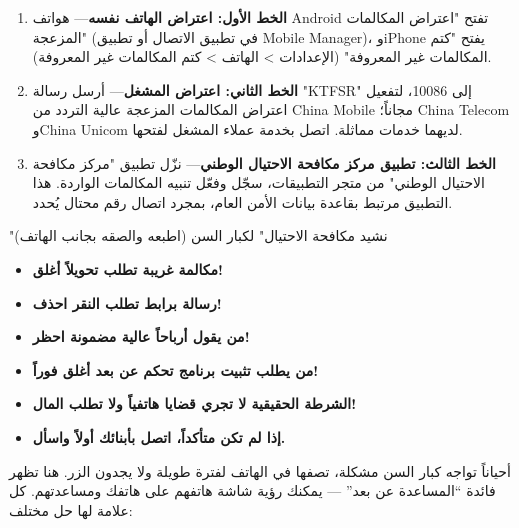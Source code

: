 
\begin{enumerate}
  \item \textbf{الخط الأول: اعتراض الهاتف نفسه}— هواتف Android تفتح "اعتراض المكالمات المزعجة" (في تطبيق الاتصال أو تطبيق Mobile Manager)، وiPhone يفتح "كتم المكالمات غير المعروفة" (الإعدادات > الهاتف > كتم المكالمات غير المعروفة).
  \item \textbf{الخط الثاني: اعتراض المشغل}— أرسل رسالة "KTFSR" إلى 10086، لتفعيل اعتراض المكالمات المزعجة عالية التردد من China Mobile مجاناً؛ China Telecom وChina Unicom لديهما خدمات مماثلة. اتصل بخدمة عملاء المشغل لفتحها.
  \item \textbf{الخط الثالث: تطبيق مركز مكافحة الاحتيال الوطني}— نزّل تطبيق "مركز مكافحة الاحتيال الوطني" من متجر التطبيقات، سجّل وفعّل تنبيه المكالمات الواردة. هذا التطبيق مرتبط بقاعدة بيانات الأمن العام، بمجرد اتصال رقم محتال يُحدد.
\end{enumerate}

\begin{tcbwarn}{"نشيد مكافحة الاحتيال" لكبار السن (اطبعه والصقه بجانب الهاتف)}
\begin{itemize}
  \item \textbf{مكالمة غريبة تطلب تحويلاً أغلق!}
  \item \textbf{رسالة برابط تطلب النقر احذف!}
  \item \textbf{من يقول أرباحاً عالية مضمونة احظر!}
  \item \textbf{من يطلب تثبيت برنامج تحكم عن بعد أغلق فوراً!}
  \item \textbf{الشرطة الحقيقية لا تجري قضايا هاتفياً ولا تطلب المال!}
  \item \textbf{إذا لم تكن متأكداً، اتصل بأبنائك أولاً واسأل.}
\end{itemize}

\end{tcbwarn}


أحياناً تواجه كبار السن مشكلة، تصفها في الهاتف لفترة طويلة ولا يجدون الزر. هنا تظهر فائدة “المساعدة عن بعد” — يمكنك رؤية شاشة هاتفهم على هاتفك ومساعدتهم. كل علامة لها حل مختلف:

